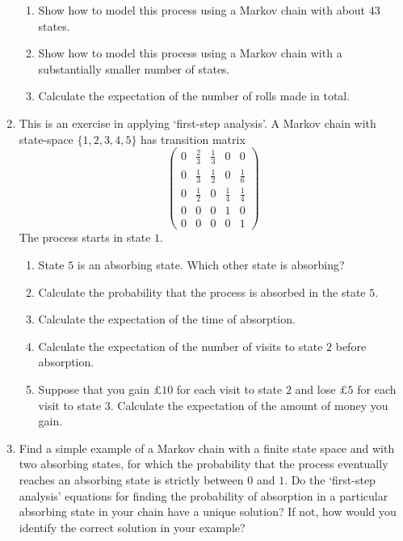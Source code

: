 \documentclass[11pt,a4paper,twoside]{report}
\begin{document}
\begin{enumerate}
   \begin{enumerate}
     \item Show how to model this process using a Markov chain with about $43$ states.
     \item Show how to model this process using a Markov chain with a substantially smaller number of states.
     \item Calculate the expectation of the number of rolls made in total.
   \end{enumerate}
   
   \item  This is an exercise in applying ‘first-step analysis’. A Markov chain with state-space $\{1, 2, 3, 4, 5\}$ has transition matrix
   		$$\begin{pmatrix}
   			0 & \frac{2}{3} & \frac{1}{3} & 0 & 0\\
   			0 & \frac{1}{3} & \frac{1}{2} & 0 & \frac{1}{6}\\
   			0 & \frac{1}{2} & 0 & \frac{1}{4} & \frac{1}{4}\\
   			0 & 0 & 0 & 1 & 0 \\
   			0 & 0 & 0 & 0 & 1
   		 \end{pmatrix}$$
The process starts in state $1$.

   \begin{enumerate}
     \item State $5$ is an absorbing state. Which other state is absorbing?
     \item Calculate the probability that the process is absorbed in the state $5$.
     \item Calculate the expectation of the time of absorption.
     \item Calculate the expectation of the number of visits to state $2$ before absorption.
     \item Suppose that you gain $\pounds 10$ for each visit to state $2$ and lose $\pounds 5$ for each visit to state $3$. Calculate the expectation of the amount of money you gain.

   \end{enumerate}

   \item Find a simple example of a Markov chain with a finite state space and with two absorbing states, for which the probability that the process eventually reaches an absorbing state is strictly between $0$ and $1$. Do the ‘first-step analysis’ equations for finding the probability of absorption in a particular absorbing state in your chain have a unique solution? If not, how would you identify the correct solution in your example?
   
\end{enumerate}
 
 
 
\end{document}
